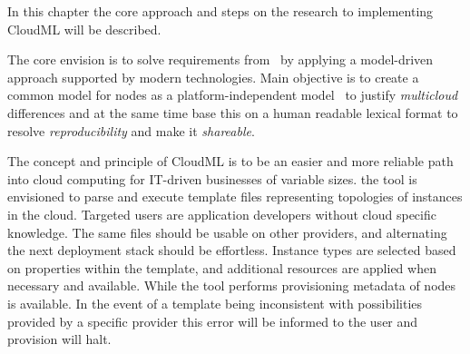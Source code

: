 %

In this chapter the core approach and steps on the research to implementing CloudML will be described.


The core envision is to solve requirements from~ by applying a 
model-driven approach supported by modern technologies.
Main objective is to create a common model for nodes as a platform-independent 
model~\cite{agile:cuong10}
to justify \emph{multicloud} differences and 
at the same time base this on a human readable lexical format to resolve \emph{reproducibility} and
make it \emph{shareable}.

The concept and principle of CloudML is to be an easier and more reliable
path into cloud computing for IT-driven businesses of variable sizes.
the tool is envisioned to parse and execute template files representing topologies
of instances in the cloud. Targeted users are application developers without
cloud specific knowledge. The same files should be usable on other providers,
and alternating the next deployment stack should be effortless.
Instance types are selected based on properties within the template,
and additional resources are applied when necessary and available.
While the tool performs provisioning metadata of nodes is available.
In the event of a template being inconsistent with possibilities 
provided by a specific provider this error will be informed 
to the user and provision will halt.

